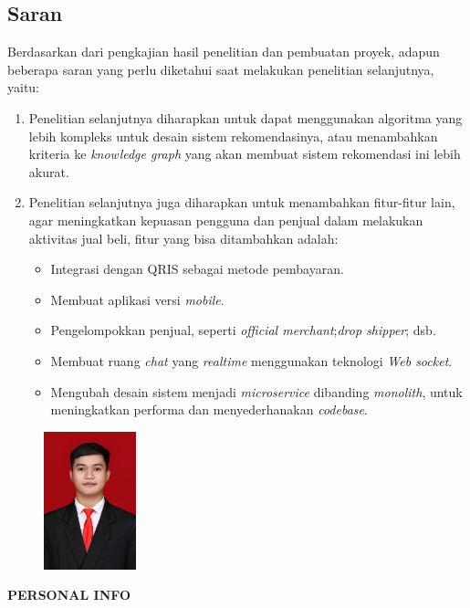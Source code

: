 \documentclass[a4paper]{article}
\newcommand{\subbab}[1]{%
    \subsection{#1}%
    \setcounter{figure}{0}
    \setcounter{table}{0}
}
\begin{document}
\subbab{Saran}
Berdasarkan dari pengkajian hasil penelitian dan pembuatan proyek, adapun beberapa saran yang perlu diketahui saat melakukan penelitian selanjutnya, yaitu:
\begin{enumerate}
    \item Penelitian selanjutnya diharapkan untuk dapat menggunakan algoritma yang lebih kompleks untuk desain sistem rekomendasinya, atau menambahkan kriteria ke \textit{knowledge graph} yang akan membuat sistem rekomendasi ini lebih akurat.

    \item Penelitian selanjutnya juga diharapkan untuk menambahkan fitur-fitur lain, agar meningkatkan kepuasan pengguna dan penjual dalam melakukan aktivitas jual beli, fitur yang bisa ditambahkan adalah:
    \begin{itemize}
        \item Integrasi dengan QRIS sebagai metode pembayaran.
        \item Membuat aplikasi versi \textit{mobile}.
        \item Pengelompokkan penjual, seperti \textit{official merchant};\textit{drop shipper}; dsb.
        \item Membuat ruang \textit{chat} yang \textit{realtime} menggunakan teknologi \textit{Web socket}.
        \item Mengubah desain sistem menjadi \textit{microservice} dibanding \textit{monolith}, untuk meningkatkan performa dan menyederhanakan \textit{codebase}.
    \end{itemize}
\end{enumerate}

\newpage
{}
\printbibliography[title=Daftar Pustaka]

\newpage
\begin{figure}[h]
    \includegraphics*[height=4cm]{./images/foto/aldih.jpg}
    \centering
\end{figure}

\noindent\textbf{PERSONAL INFO}
\end{document}
